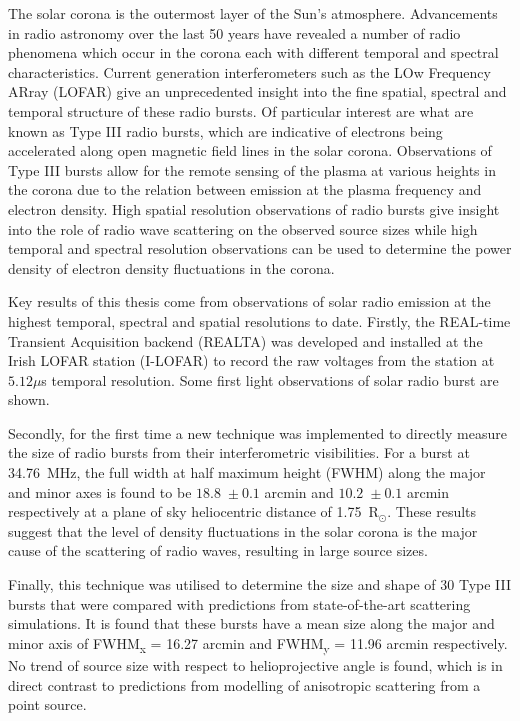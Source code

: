 \begin{abstracts} 
The solar corona is the outermost layer of the Sun's atmosphere. Advancements in radio astronomy over the last 50 years have revealed a number of radio phenomena which occur in the corona each with different temporal and spectral characteristics. Current generation interferometers such as the LOw Frequency ARray (LOFAR) give an unprecedented insight into the fine spatial, spectral and temporal structure of these radio bursts. Of particular interest are what are known as Type III radio bursts, which are indicative of electrons being accelerated along open magnetic field lines in the solar corona. Observations of Type III bursts allow for the remote sensing of the plasma at various heights in the corona due to the relation between emission at the plasma frequency and electron density. High spatial resolution observations of radio bursts give insight into the role of radio wave scattering on the observed source sizes while high temporal and spectral resolution observations can be used to determine the power density of electron density fluctuations in the corona.

Key results of this thesis come from observations of solar radio emission at the highest temporal, spectral and spatial resolutions to date. Firstly, the REAL-time Transient Acquisition backend (REALTA) was developed and installed at the Irish LOFAR station (I-LOFAR) to record the raw voltages from the station at $5.12 \mu$s temporal resolution. Some first light observations of solar radio burst are shown.

Secondly, for the first time a new technique was implemented to directly measure the size of radio bursts from their interferometric visibilities. For a burst at 34.76~MHz, the full width at half maximum height (FWHM) along the major and minor axes is found to be $18.8$~$\pm~0.1$ arcmin and $10.2$~$\pm~0.1$ arcmin respectively at a plane of sky heliocentric distance of 1.75~R$_\odot$. These results suggest that the level of density fluctuations in the solar corona  is  the  major  cause  of  the  scattering  of  radio  waves, resulting in  large  source  sizes.

Finally, this technique was utilised to determine the size and shape of 30 Type III bursts that were compared with predictions from state-of-the-art scattering simulations. It is found that these bursts have a mean size along the major and minor axis of FWHM\textsubscript{x} = 16.27 arcmin and FWHM\textsubscript{y} = 11.96 arcmin respectively. No trend of source size with respect to helioprojective angle is found, which is in direct contrast to predictions from modelling of anisotropic scattering from a point source.


\end{abstracts}
